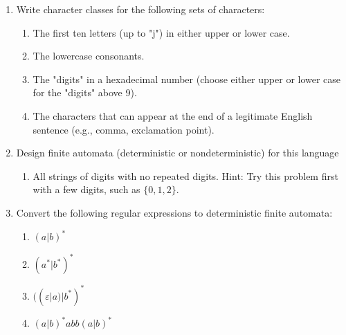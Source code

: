 \documentclass{article}
\begin{document}
\begin{enumerate}
\begin{enumerate}
    \end{enumerate}
    \item Write character classes for the following sets of characters:
    \begin{enumerate}
        \item The first ten letters (up to "j") in either upper or lower case.
        \item The lowercase consonants.
        \item The "digits" in a hexadecimal number (choose either upper or lower case for the "digits" above 9).
        \item The characters that can appear at the end of a legitimate English sentence (e.g., comma, exclamation point).
    \end{enumerate}
    \item Design finite automata (deterministic or nondeterministic) for this language
    \begin{enumerate}
        \item All strings of digits with no repeated digits. Hint: Try this problem first with a few digits, such as $\{0, 1, 2\}$.
    \end{enumerate}
    \item Convert the following regular expressions to deterministic finite automata:
    \begin{enumerate}
        \item $(a|b)^*$
        \item $(a^*|b^*)^*$
        \item $((\varepsilon|a)|b^*)^*$
        \item $(a|b)^*abb(a|b)^*$
    \end{enumerate}
\end{enumerate}
\end{document}

